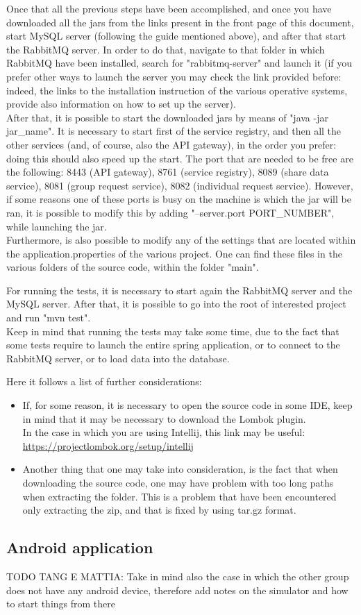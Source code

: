 Once that all the previous steps have been accomplished, and once you have downloaded all the jars from the links present in the front page
of this document, start MySQL server (following the guide mentioned above), and after that start the RabbitMQ server. In order to do that, 
navigate to that folder in which RabbitMQ have been installed, search for "rabbitmq-server" and launch it (if you prefer other ways to launch
the server you may check the link provided before: indeed, the links to the installation instruction of the various operative systems,
provide also information on how to set up the server). \\
After that, it is possible to start the downloaded jars by means of "java -jar jar\_name". 
It is necessary to start first of the service registry, and then all the other services (and, of course, also the API gateway), in the
order you prefer: doing this should also speed up the start. 
The port that are needed to be free are the following: 8443 (API gateway), 8761 (service registry), 8089 (share data service), 8081 (group
request service), 8082 (individual request service). However, if some reasons one of these ports is busy on the
machine is which the jar will be ran, it is possible to modify this by adding "--server.port PORT\_NUMBER", while launching the jar. \\
Furthermore, is also possible to modify any of the settings that are located within the application.properties of the various project.
One can find these files in the various folders of the source code, within the folder "main".\\

\par 
For running the tests, it is necessary to start again the RabbitMQ server and the MySQL server. After that, it is possible to go into
the root of interested project and run "mvn test". \\
Keep in mind that running the tests may take some time, due to the fact that some tests require to launch the entire spring application,
or to connect to the RabbitMQ server, or to load data into the database. 

\par 
Here it follows a list of further considerations: 
\begin{itemize}
\item If, for some reason, it is necessary to open the source code in some IDE, keep in mind that it
may be necessary to download the Lombok plugin. \\
In the case in which you are using Intellij, this link may be useful:\\
\url{https://projectlombok.org/setup/intellij}

\item Another thing that one may take into consideration, is the fact that when downloading the source code, one may have problem with too long
paths when extracting the folder. This is a problem that have been encountered only extracting the zip, and that is fixed
by using tar.gz format. 

\end{itemize}

\subsection{Android application}
TODO TANG E MATTIA: Take in mind also the case in which the other group does not have any android device, therefore add notes on the simulator
and how to start things from there